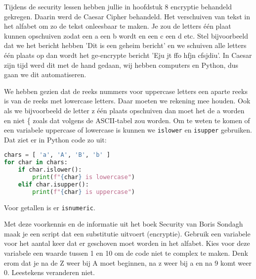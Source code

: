 Tijdens de security lessen hebben jullie in hoofdstuk 8 encryptie behandeld gekregen. Daarin werd de Caesar Cipher behandeld. Het verschuiven van tekst in het alfabet om zo de tekst onleesbaar te maken. Je zou de letters \'e\'en plaat kunnen opschuiven zodat een a een b wordt en een c een d etc. Stel bijvoorbeeld dat we het bericht hebben 'Dit is een geheim bericht' en we schuiven alle letters \'e\'en plaats op dan wordt het ge-encrypte bericht 'Eju jt ffo hfjn cfsjdiu'. In Caesar zijn tijd werd dit met de hand gedaan, wij hebben computers en Python, dus gaan we dit automatiseren.

We hebben gezien dat de reeks nummers voor uppercase letters een aparte reeks is van de reeks met lowercase letters. Daar moeten we rekening mee houden. Ook als we bijvoorbeeld de letter z \'e\'en plaats opschuiven dan moet het de a worden en niet \{ zoals dat volgens de ASCII-tabel zou worden. Om te weten te komen of een variabele uppercase of lowercase is kunnen we \texttt{islower} en \texttt{isupper} gebruiken. Dat ziet er in Python code zo uit:
\begin{lstlisting}[language=python]
chars = [ 'a', 'A', 'B', 'b' ]
for char in chars:
    if char.islower():
        print(f"{char} is lowercase")
    elif char.isupper():
        print(f"{char} is uppercase")
\end{lstlisting}
Voor getallen is er \texttt{isnumeric}.

Met deze voorkennis en de informatie uit het boek Security van Boris Sondagh maak je een script dat een substitutie uitvoert (encryptie). Gebruik een variabele voor het aantal keer dat er geschoven moet worden in het alfabet. Kies voor deze variabele een waarde tussen 1 en 10 om de code niet te complex te maken. Denk erom dat je na de Z weer bij A moet beginnen, na z weer bij a en na 9 komt weer 0. Leestekens veranderen niet.
